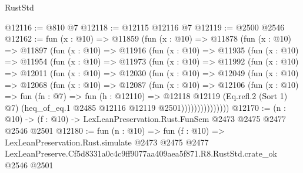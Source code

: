 \begin{lexlean}{RustStd}
\begin{coremodule}
@12116 := @810 @7
@12118 := @12115 @12116 @7
@12119 := @2500 @2546
@12162 := fun (x : @10) =>
  @11859
    (fun (x : @10) =>
    @11878
      (fun (x : @10) =>
      @11897
        (fun (x : @10) =>
        @11916
          (fun (x : @10) =>
          @11935
            (fun (x : @10) =>
            @11954
              (fun (x : @10) =>
              @11973
                (fun (x : @10) =>
                @11992
                  (fun (x : @10) =>
                  @12011
                    (fun (x : @10) =>
                    @12030
                      (fun (x : @10) =>
                      @12049
                        (fun (x : @10) =>
                        @12068
                          (fun (x : @10) =>
                          @12087
                            (fun (x : @10) =>
                            @12106
                              (fun (x : @10) =>
                              fun (fn : @7) =>
                              fun (h : @12110) =>
                              @12118
                                @12119
                                (Eq.refl.{2} (Sort 1) @7)
                                (heq_of_eq.{1} @2485 @12116 @12119 @2501)))))))))))))))
@12170 := (n : @10) -> (f : @10) -> LexLeanPreservation.Rust.FunSem @2473 @2475 @2477 @2546 @2501
@12180 := fun (n : @10) =>
  fun (f : @10) =>
  LexLeanPreservation.Rust.simulate
    @2473
    @2475
    @2477
    LexLeanPreserve.Cf5d8331a0c4c9ff9077aa409aea5f871.R8.RustStd.crate_ok
    @2546
    @2501
\end{coremodule}
\end{lexlean}
